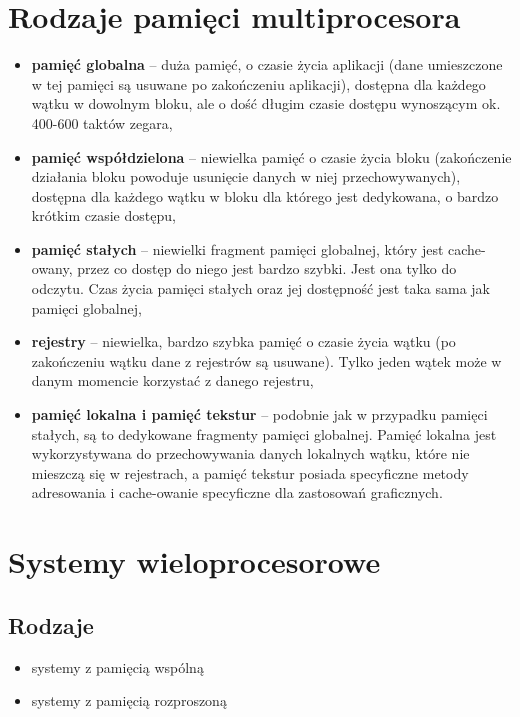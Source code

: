 \section{Rodzaje pamięci multiprocesora}
	\begin{itemize}
		\item \textbf{pamięć globalna} – duża pamięć, o czasie życia aplikacji (dane umieszczone w tej pamięci są usuwane po zakończeniu aplikacji), dostępna dla każdego wątku w dowolnym bloku, ale o dość długim czasie dostępu wynoszącym ok. 400-600 taktów zegara,
		\item \textbf{pamięć współdzielona} – niewielka pamięć o czasie życia bloku (zakończenie działania bloku powoduje usunięcie danych w niej przechowywanych), dostępna dla każdego wątku w bloku dla którego jest dedykowana, o bardzo krótkim czasie dostępu,
		\item \textbf{pamięć stałych} – niewielki fragment pamięci globalnej, który jest cache-owany, przez co dostęp do niego jest bardzo szybki. Jest ona tylko do odczytu. Czas życia pamięci stałych oraz jej dostępność jest taka sama jak pamięci globalnej,
		\item \textbf{rejestry} – niewielka, bardzo szybka pamięć o czasie życia wątku (po zakończeniu wątku dane z rejestrów są usuwane). Tylko jeden wątek może w danym momencie korzystać z danego rejestru,
		\item \textbf{pamięć lokalna i pamięć tekstur} – podobnie jak w przypadku pamięci stałych, są to dedykowane fragmenty pamięci globalnej. Pamięć lokalna jest wykorzystywana do przechowywania danych lokalnych wątku, które nie mieszczą się w rejestrach, a pamięć tekstur posiada specyficzne metody adresowania i cache-owanie specyficzne dla zastosowań graficznych.
	\end{itemize}
	
\section{Systemy wieloprocesorowe}
	\subsection{Rodzaje}
		\begin{itemize}
			\item systemy z pamięcią wspólną
			\item systemy z pamięcią rozproszoną
		\end{itemize}
